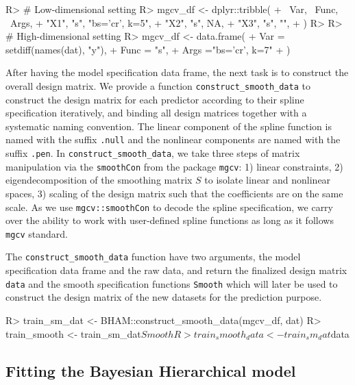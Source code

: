 \documentclass[
]{jss}
\begin{document}
\begin{CodeChunk}
\begin{CodeInput}
R> # Low-dimensional setting
R> mgcv_df <- dplyr::tribble(
+   ~Var, ~Func, ~Args,
+   "X1",  "s",     "bs='cr', k=5",
+   "X2",  "s",     NA,
+   "X3",  "s",    "",
+ )
R> 
R> # High-dimensional setting
R> mgcv_df <- data.frame(
+   Var = setdiff(names(dat), "y"),
+   Func = "s",
+   Args ="bs='cr', k=7"
+ )
\end{CodeInput}
\end{CodeChunk}

After having the model specification data frame, the next task is to
construct the overall design matrix. We provide a function
\texttt{construct\_smooth\_data} to construct the design matrix for each
predictor according to their spline specification iteratively, and
binding all design matrices together with a systematic naming
convention. The linear component of the spline function is named with
the suffix \texttt{.null} and the nonlinear components are named with
the suffix \texttt{.pen}. In \texttt{construct\_smooth\_data}, we take
three steps of matrix manipulation via the \texttt{smoothCon} from the
package \texttt{mgcv}: 1) linear constraints, 2) eigendecomposition of
the smoothing matrix \(S\) to isolate linear and nonlinear spaces, 3)
scaling of the design matrix such that the coefficients are on the same
scale. As we use \texttt{mgcv::smoothCon} to decode the spline
specification, we carry over the ability to work with user-defined
spline functions as long as it follows \texttt{mgcv} standard.

The \texttt{construct\_smooth\_data} function have two arguments, the
model specification data frame and the raw data, and return the
finalized design matrix \texttt{data} and the smooth specification
functions \texttt{Smooth} which will later be used to construct the
design matrix of the new datasets for the prediction purpose.

\begin{CodeChunk}
\begin{CodeInput}
R> train_sm_dat <- BHAM::construct_smooth_data(mgcv_df, dat)
R> train_smooth <- train_sm_dat$Smooth
R> train_smooth_data <- train_sm_dat$data
\end{CodeInput}
\end{CodeChunk}

\subsection{Fitting the Bayesian Hierarchical model}
\end{document}
